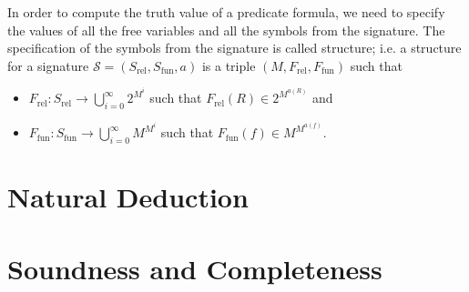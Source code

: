 In order to compute the truth value of a predicate formula, we need to specify
the values of all the free variables and all the symbols from the signature.
The specification of the symbols from the signature is called structure; i.e.
a structure for a signature $\mathcal{S} = (S_\mathrm{rel}, S_\mathrm{fun}, a)$
is a triple $(M, F_\mathrm{rel}, F_\mathrm{fun})$ such that
\begin{itemize}
  \item $F_\mathrm{rel} : S_\mathrm{rel} \to \bigcup_{i = 0}^\infty 2^{M^i}$
    such that $F_\mathrm{rel}(R) \in 2^{M^{a(R)}}$ and
  \item $F_\mathrm{fun} : S_\mathrm{fun} \to \bigcup_{i = 0}^\infty M^{M^i}$
    such that $F_\mathrm{fun}(f) \in M^{M^{a(f)}}$.
\end{itemize}




\section{Natural Deduction}
\section{Soundness and Completeness}
